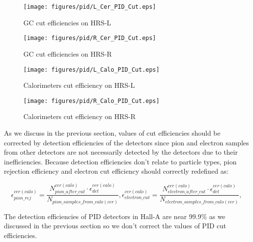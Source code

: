 \begin{figure}[h!]
\centerline{\texttt{[image: figures/pid/L\_Cer\_PID\_Cut.eps]}}
\caption[GC cut efficiencies on HRS-L]{\footnotesize{GC cut efficiencies on HRS-L}}
\label{Lgc_eff}
\end{figure}

\begin{figure}[h!]
\centerline{\texttt{[image: figures/pid/R\_Cer\_PID\_Cut.eps]}}
\caption[GC cut efficiencies on HRS-R]{\footnotesize{GC cut efficiencies on HRS-R}}
\label{Rgc_eff}
\end{figure}

\begin{figure}[h!]
\centerline{\texttt{[image: figures/pid/L\_Calo\_PID\_Cut.eps]}}
\caption[Calorimeters cut efficiency on HRS-L]{\footnotesize{Calorimeters cut efficiency on HRS-L}}
\label{Lcalo_eff}
\end{figure}

\begin{figure}[h!]
\centerline{\texttt{[image: figures/pid/R\_Calo\_PID\_Cut.eps]}}
\caption[Calorimeters cut efficiency on HRS-R]{\footnotesize{Calorimeters cut efficiency on HRS-R}}
\label{Rcalo_eff}
\end{figure}

As we discuss in the previous section, values of cut efficiencies should be corrected by detection efficiencies of the detectors since pion and electron samples from other detectors are not necessarily detected by the detectors due to their inefficiencies. Because detection efficiencies don't relate to particle types, pion rejection efficiency and electron cut efficiency should correctly redefined as:
 
\begin{equation}
 \epsilon_{pion\_rej}^{cer(calo)} = \frac{N_{pion\_after\_cut}^{cer(calo)} \cdot \epsilon_{det}^{cer(calo)}}{N_{pion\_samples\_from\_calo(cer)}},  \epsilon_{electron\_cut}^{cer(calo)} = \frac{N_{electron\_after\_cut}^{cer(calo)} \cdot \epsilon_{det}^{cer(calo)}}{N_{electron\_samples\_from\_calo(cer)}},        
\end{equation}

 The detection efficiencies of PID detectors in Hall-A are near 99.9\% as we discussed in the previous section so we don't correct the values of PID cut efficiencies. 